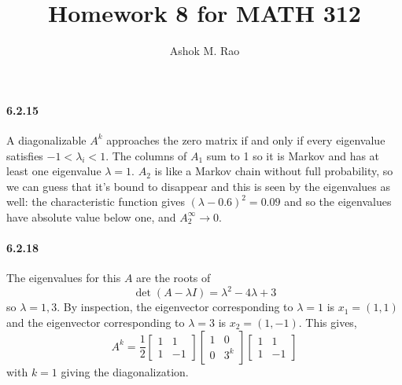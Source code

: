 \documentclass[10pt]{scrartcl}
\title{Homework 8 for MATH 312}
\author{Ashok M. Rao}
\begin{document}
\maketitle
{}

\paragraph{6.2.15} A diagonalizable $A^k$ approaches the zero matrix if and only if every eigenvalue satisfies $-1<\lambda_i<1$. The columns of $A_1$ sum to 1 so it is Markov and has at least one eigenvalue $\lambda=1$. $A_2$ is like a Markov chain without full probability, so we can guess that it's bound to disappear and this is seen by the eigenvalues as well: the characteristic function gives $(\lambda-0.6)^2 = 0.09$ and so the eigenvalues have absolute value below one, and $A_{2}^{\infty}\to 0$.

\paragraph{6.2.18} The eigenvalues for this $A$ are the roots of \[\det{(A-\lambda I)}= \lambda^2 - 4\lambda +3\] so $\lambda=1,3$.
By inspection, the eigenvector corresponding to $\lambda=1$ is $x_1 = (1,1)$ and the eigenvector corresponding to $\lambda=3$ is $x_2=(1,-1)$. This gives,
\[A^k = \frac{1}{2}\begin{bmatrix}1&1\\1&-1\end{bmatrix}\begin{bmatrix}1&0\\0&3^k\end{bmatrix}\begin{bmatrix}1&1\\1&-1\end{bmatrix}\]
with $k=1$ giving the diagonalization.
\end{document}
